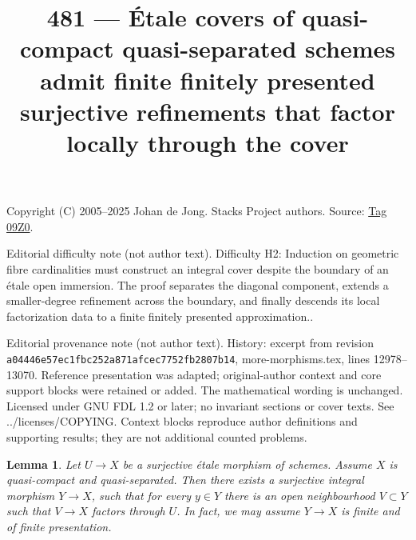 \documentclass{amsart}
\theoremstyle{plain}
\newtheorem{lemma}[subsection]{Lemma}
\theoremstyle{definition}
\theoremstyle{remark}
\numberwithin{equation}{subsection}
\begin{document}
\title[Stacks Project, Tag 09Z0]{481 --- Étale covers of quasi-compact quasi-separated schemes admit finite finitely presented surjective refinements that factor locally through the cover}
\maketitle
\noindent Copyright (C) 2005--2025 Johan de Jong. Stacks Project authors. Source: \href{https://stacks.math.columbia.edu/tag/09Z0}{Tag 09Z0}.

\noindent Editorial difficulty note (not author text). Difficulty H2: Induction on geometric fibre cardinalities must construct an integral cover despite the boundary of an étale open immersion. The proof separates the diagonal component, extends a smaller-degree refinement across the boundary, and finally descends its local factorization data to a finite finitely presented approximation..

\noindent Editorial provenance note (not author text). History: excerpt from revision \texttt{a0444\allowbreak 6e57e\allowbreak c1fbc\allowbreak 252a8\allowbreak 71afc\allowbreak ec775\allowbreak 2fb28\allowbreak 07b14}, more-morphisms.tex, lines 12978--13070. Reference presentation was adapted; original-author context and core support blocks were retained or added. The mathematical wording is unchanged. Licensed under GNU FDL 1.2 or later; no invariant sections or cover texts. See ../licenses/COPYING. Context blocks reproduce author definitions and supporting results; they are not additional counted problems.

\begin{lemma}
\label{lemma-there-is-a-scheme-integral-over}
Let $U \to X$ be a surjective \'etale morphism of schemes. Assume $X$
is quasi-compact and quasi-separated. Then there exists a surjective
integral morphism $Y \to X$, such that for
every $y \in Y$ there is an open neighbourhood $V \subset Y$
such that $V \to X$ factors through $U$. In fact, we may assume
$Y \to X$ is finite and of finite presentation.
\end{lemma}
\end{document}
